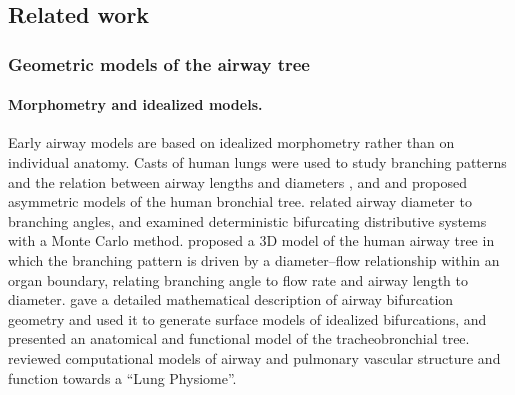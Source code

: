 
\subsection{Related work}                %
\label{sec:related}                      %

\subsubsection{Geometric models of the airway tree}  %
\label{sec:related_geometry}             %

\paragraph{Morphometry and idealized models.}  %
Early airway models are based on idealized morphometry rather than on individual anatomy.
Casts of human lungs were used to study branching patterns and the relation between airway
lengths and diameters \cite{horsfield1986}, and \citet{horsfield1971models} and
\citet{yeh1980models} proposed asymmetric models of the human bronchial tree.
\citet{kamiya1974} related airway diameter to branching angles, and \citet{wang1992} examined
deterministic bifurcating distributive systems with a Monte Carlo method.
\citet{kitaoka1999} proposed a 3D model of the human airway tree in which the branching
pattern is driven by a diameter--flow relationship within an organ boundary, relating
branching angle to flow rate and airway length to diameter. \citet{hegedus2004} gave a
detailed mathematical description of airway bifurcation geometry and used it to generate
surface models of idealized bifurcations, and \citet{florens2010} presented an anatomical and
functional model of the tracheobronchial tree. \citet{tawhai2011} reviewed computational
models of airway and pulmonary vascular structure and function towards a ``Lung Physiome''.

